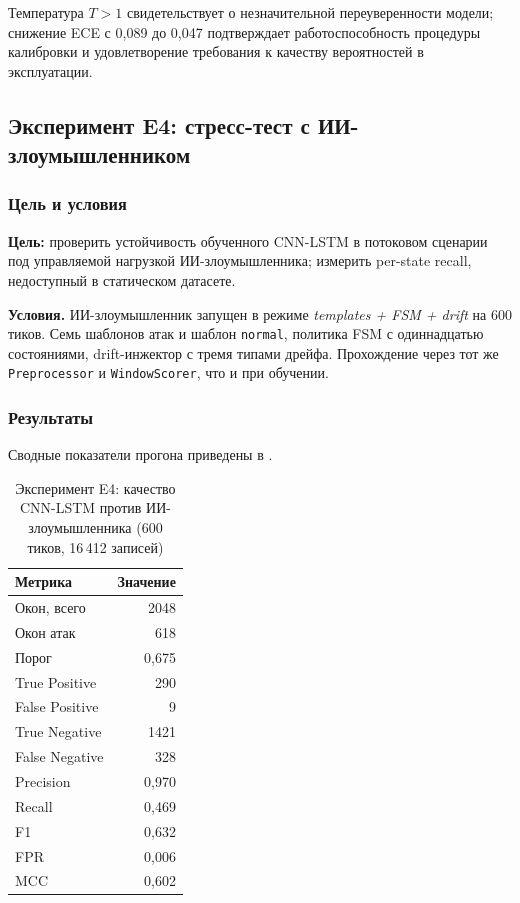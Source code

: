 Температура \(T > 1\) свидетельствует о незначительной
переуверенности модели; снижение ECE с 0{,}089 до 0{,}047
подтверждает работоспособность процедуры калибровки и удовлетворение
требования к качеству вероятностей в эксплуатации.

\subsection{Эксперимент E4: стресс-тест с ИИ-злоумышленником}
\label{subsec:E4}

\subsubsection{Цель и условия}

\textbf{Цель:} проверить устойчивость обученного CNN-LSTM в
потоковом сценарии под управляемой нагрузкой
ИИ-злоумышленника; измерить per-state recall, недоступный в
статическом датасете.

\textbf{Условия.} ИИ-злоумышленник запущен в режиме
\emph{templates + FSM + drift} на 600 тиков. Семь шаблонов атак и
шаблон \texttt{normal}, политика FSM с одиннадцатью состояниями,
drift-инжектор с тремя типами дрейфа. Прохождение через тот же
\texttt{Preprocessor} и \texttt{WindowScorer}, что и при обучении.

\subsubsection{Результаты}

Сводные показатели прогона приведены в .

\begin{table}[H]
\centering
\caption{Эксперимент E4: качество CNN-LSTM против ИИ-злоумышленника
(600 тиков, 16\,412 записей)}
\label{tab:E4-overall}
\renewcommand{\arraystretch}{1.2}
\begin{tabular}{lr}
\toprule
\textbf{Метрика} & \textbf{Значение} \\
\midrule
Окон, всего       & 2048      \\
Окон атак         & 618       \\
Порог             & 0{,}675   \\
\midrule
True Positive     & 290       \\
False Positive    & 9         \\
True Negative     & 1421      \\
False Negative    & 328       \\
\midrule
Precision         & 0{,}970   \\
Recall            & 0{,}469   \\
F1                & 0{,}632   \\
FPR               & 0{,}006   \\
MCC               & 0{,}602   \\
\bottomrule
\end{tabular}
\end{table}

